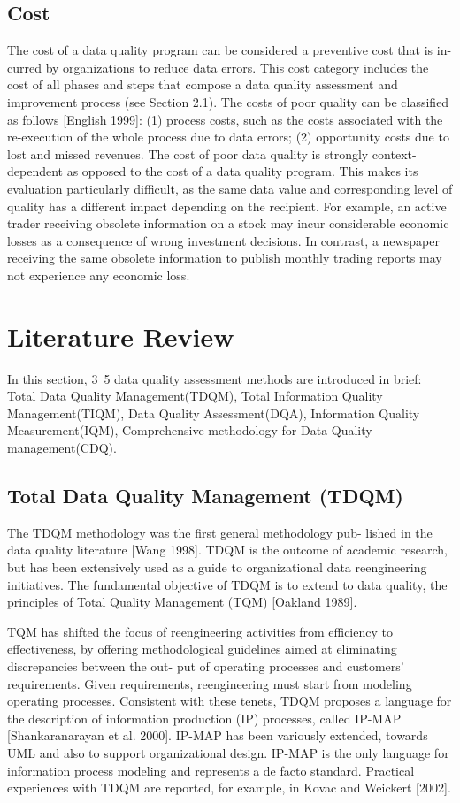 \documentclass[pdftex,english,oribibl]{llncs}
\begin{document}
    \subsection{Cost}
    The cost of a data quality program can be considered a preventive cost that is in- curred by organizations to reduce data errors. This cost category includes the cost of all phases and steps that compose a data quality assessment and improvement process (see Section 2.1).
    The costs of poor quality can be classified as follows [English 1999]:
    (1) process costs, such as the costs associated with the re-execution of the whole process due to data errors;
    (2) opportunity costs due to lost and missed revenues.
    The cost of poor data quality is strongly context-dependent as opposed to the cost of a data quality program. This makes its evaluation particularly difficult, as the same data value and corresponding level of quality has a different impact depending on the recipient. For example, an active trader receiving obsolete information on a stock may incur considerable economic losses as a consequence of wrong investment decisions. In contrast, a newspaper receiving the same obsolete information to publish monthly trading reports may not experience any economic loss.


    \section{Literature Review}
    In this section, 3~5 data quality assessment methods are introduced in brief:
    Total Data Quality Management(TDQM),
    Total Information Quality Management(TIQM),
    Data Quality Assessment(DQA),
    Information Quality Measurement(IQM),
    Comprehensive methodology for Data Quality management(CDQ).



    \subsection{Total Data Quality Management (TDQM)}

    The TDQM methodology was the first general methodology pub- lished in the data quality literature [Wang 1998]. TDQM is the outcome of academic research, but has been extensively used as a guide to organizational data reengineering initiatives. The fundamental objective of TDQM is to extend to data quality, the principles of Total Quality Management (TQM) [Oakland 1989].

    TQM has shifted the focus of reengineering activities from efficiency to effectiveness, by offering methodological guidelines aimed at eliminating discrepancies between the out- put of operating processes and customers’ requirements. Given requirements, reengineering must start from modeling operating processes. Consistent with these tenets, TDQM proposes a language for the description of information production (IP) processes, called IP-MAP [Shankaranarayan et al. 2000]. IP-MAP has been variously extended, towards UML and also to support organizational design. IP-MAP is the only language for information process modeling and represents a de facto standard. Practical experiences with TDQM are reported, for example, in Kovac and Weickert [2002].
\end{document}

